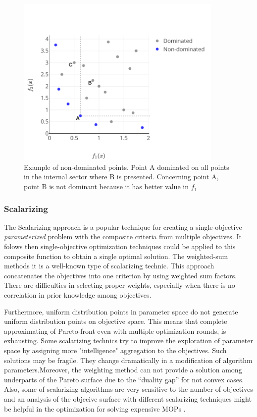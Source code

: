                 \begin{figure}
                    \centering 
                    \includegraphics[width=10cm]{content/images/ndom}
                    \caption[Non-dominated points]{Example of non-dominated points. Point A dominated on all points in the internal sector where B is presented. Concerning point A, point B is not dominant because it has better value in $f_1$} 
                    \label{fig:dominated} 
                \end{figure}
        
            \subsubsection{Scalarizing}
                The Scalarizing approach is a popular technique for creating a single-objective \textit{parameterized} problem with the composite criteria from multiple objectives. It folows then single-objective optimization techniques could be applied to this composite function to obtain a single optimal solution. The weighted-sum methods it is a well-known type of scalarizing technic. This approach concatenates the objectives into one criterion by using weighted sum factors. There are difficulties in selecting proper weights, especially when there is no correlation in prior knowledge among objectives.  

                Furthermore, uniform distribution points in parameter space do not generate uniform distribution points on objective space. This means that complete approximating of Pareto-front even with multiple optimization rounds, is exhausting.
                Some scalarizing technics try to improve the exploration of parameter space by assigning more "intelligence" aggregation to the objectives. Such solutions may be fragile. They change dramatically in a modification of algorithm parameters.Moreover, the weighting method can not provide a solution among underparts of the Pareto surface due to the “duality gap” for not convex cases.                 Also, some of scalarizing algorithms are very sensitive to the number of objectives and an analysis of the objecive surface with different scalarizing techniques might be helpful in the optimization for solving expensive MOPs \cite{ChughScal2019}.

